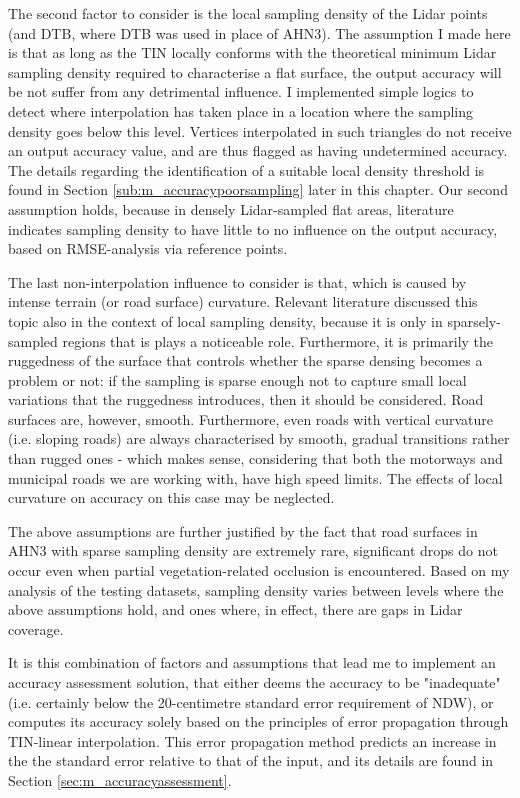 The second factor to consider is the local sampling density of the Lidar points (and DTB, where DTB was used in place of AHN3). The assumption I made here is that as long as the TIN locally conforms with the theoretical minimum Lidar sampling density required to characterise a flat surface, the output accuracy will be not suffer from any detrimental influence. I implemented simple logics to detect where interpolation has taken place in a location where the sampling density goes below this level. Vertices interpolated in such triangles do not receive an output accuracy value, and are thus flagged as having undetermined accuracy. The details regarding the identification of a suitable local density threshold is found in Section \ref{sub:m_accuracypoorsampling} later in this chapter. Our second assumption holds, because in densely Lidar-sampled flat areas, literature indicates sampling density to have little to no influence on the output accuracy, based on RMSE-analysis via reference points.

The last non-interpolation influence to consider is that, which is caused by intense terrain (or road surface) curvature. Relevant literature discussed this topic also in the context of local sampling density, because it is only in sparsely-sampled regions that is plays a noticeable role. Furthermore, it is primarily the ruggedness of the surface that controls whether the sparse densing becomes a problem or not: if the sampling is sparse enough not to capture small local variations that the ruggedness introduces, then it should be considered. Road surfaces are, however, smooth. Furthermore, even roads with vertical curvature (i.e. sloping roads) are always characterised by smooth, gradual transitions rather than rugged ones - which makes sense, considering that both the motorways and municipal roads we are working with, have high speed limits. The effects of local curvature on accuracy on this case may be neglected.

The above assumptions are further justified by the fact that road surfaces in AHN3 with sparse sampling density are extremely rare, significant drops do not occur even when partial vegetation-related occlusion is encountered. Based on my analysis of the testing datasets, sampling density varies between levels where the above assumptions hold, and ones where, in effect, there are gaps in Lidar coverage.

It is this combination of factors and assumptions that lead me to implement an accuracy assessment solution, that either deems the accuracy to be "inadequate" (i.e. certainly below the 20-centimetre standard error requirement of NDW), or computes its accuracy solely based on the principles of error propagation through TIN-linear interpolation. This error propagation method predicts an increase in the the standard error relative to that of the input, and its details are found in Section \ref{sec:m_accuracyassessment}.


